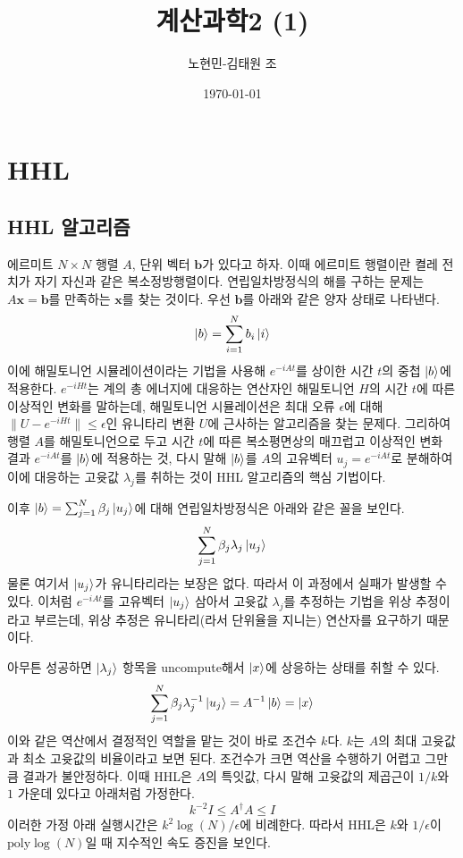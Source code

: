 \documentclass[a4paper,atbegshi,chapter,itemph,hidelinks]{oblivoir}
\title{계산과학2 (1)}
\author{노현민-김태원 조}
\date{\today}
\begin{document}
\maketitle
\tableofcontents
\chapter{HHL}
\section{HHL 알고리즘}
에르미트 $N\times N$ 행렬 $A$, 단위 벡터 $\pmb{b}$가 있다고 하자. 이때 에르미트
행렬이란 켤레 전치가 자기 자신과 같은 복소정방행렬이다. 연립일차방정식의
해를 구하는 문제는 $A\pmb{x}=\pmb{b}$를 만족하는 $\mathbf{x}$를 찾는 것이다. 우선
$\pmb{b}$를 아래와 같은 양자 상태로 나타낸다.
\[
  \ket{b} = \sum_{i=1}^N b_i\ket{i}
\]
이에 해밀토니언 시뮬레이션이라는 기법을 사용해 $e^{-iAt}$를 상이한 시간 $t$의 중첩
$\ket{b}$에 적용한다. $e^{-iHt}$는 계의 총 에너지에 대응하는 연산자인 해밀토니언
$H$의 시간 $t$에 따른 이상적인 변화를 말하는데, 해밀토니언 시뮬레이션은 최대
오류 $\epsilon$에 대해 $\|U-e^{-iHt}\|\leq\epsilon$인 유니타리 변환 $U$에 
근사하는 알고리즘을 찾는 문제다. 그리하여 행렬 $A$를 해밀토니언으로 두고
시간 $t$에 따른 복소평면상의 매끄럽고 이상적인 변화 결과 $e^{-iAt}$를 $\ket{b}$에
적용하는 것, 다시 말해 $\ket{b}$를 $A$의 고유벡터 $u_j=e^{-iAt}$로 분해하여 이에
대응하는 고윳값 $\lambda_j$를 취하는 것이 HHL 알고리즘의 핵심 기법이다.

이후 $\ket{b}=\sum_{j=1}^N\beta_j\ket{u_j}$에 대해 연립일차방정식은 아래와
같은 꼴을 보인다.
\[
  \sum_{j=1}^N\beta_j\lambda_j\ket{u_j}
\]
물론 여기서 $\ket{u_j}$가 유니타리라는 보장은 없다. 따라서 이 과정에서 실패가
발생할 수 있다. 이처럼 $e^{-iAt}$를 고유벡터 $\ket{u_j}$ 삼아서 고윳값
$\lambda_j$를 추정하는 기법을 위상 추정이라고 부르는데, 위상 추정은 유니타리(라서
단위율을 지니는) 연산자를 요구하기 때문이다. 

아무튼 성공하면 $\ket{\lambda_j}$ 항목을 uncompute해서 $\ket{x}$에 상응하는
상태를 취할 수 있다.
\[
  \sum_{j=1}^N\beta_j\lambda_j^{-1}\ket{u_j}=A^{-1}\ket{b}=\ket{x}
\]
이와 같은 역산에서 결정적인 역할을 맡는 것이 바로 조건수 $k$다. $k$는 $A$의 최대
고윳값과 최소 고윳값의 비율이라고 보면 된다. 조건수가 크면 역산을 수행하기
어렵고 그만큼 결과가 불안정하다. 이때 HHL은 $A$의 특잇값, 다시 말해 고윳값의
제곱근이 $1/k$와 $1$ 가운데 있다고 아래처럼 가정한다.
\[
  k^{-2}I\leq A^{\dagger}A \leq I
\]
이러한 가정 아래 실행시간은 $k^2\log(N)/\epsilon$에 비례한다. 따라서 HHL은
$k$와 $1/\epsilon$이 $\textrm{poly}\log(N)$일 때 지수적인 속도 증진을 보인다.
\end{document}
